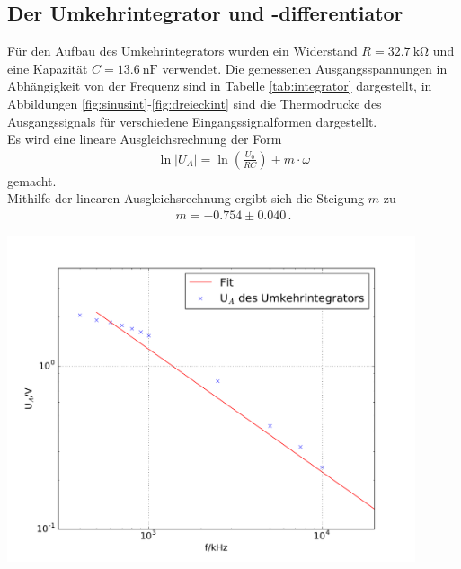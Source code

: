 \documentclass[]{scrartcl}
\begin{document}
\subsection{Der Umkehrintegrator und -differentiator}
Für den Aufbau des Umkehrintegrators wurden ein Widerstand $R=\SI{32.7}{\kilo\ohm}$ und eine Kapazität $C=\SI{13.6}{\nano\farad}$ verwendet. Die gemessenen Ausgangsspannungen in Abhängigkeit von der Frequenz sind in Tabelle \ref{tab:integrator} dargestellt, in Abbildungen \ref{fig:sinusint}-\ref{fig:dreieckint} sind die Thermodrucke des Ausgangssignals für verschiedene Eingangssignalformen dargestellt. \\
Es wird eine lineare Ausgleichsrechnung der Form 
\begin{align}
\ln |U_A| = \ln\left(\frac{U_0}{RC}\right)+m\cdot\omega
\end{align}
gemacht. \\
Mithilfe der linearen Ausgleichsrechnung ergibt sich die Steigung $m$ zu
\begin{align*}
m = -0.754\pm 0.040\,.
\end{align*}
\begin{center}
	\includegraphics[width=12cm]{images/integrator.pdf}
	\label{fig:integrator}
\end{center}
\end{document}
